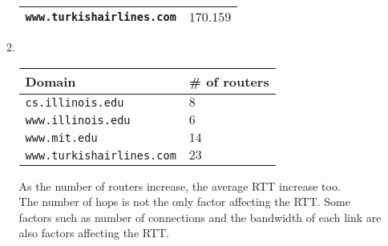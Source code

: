\documentclass[10pt, a4paper]{article}
\begin{document}
\begin{enumerate}
\begin{enumerate}
\begin{tabular}{ll}
        \texttt{www.turkishairlines.com} & $170.159$\\
        \bottomrule
        \end{tabular}
    \item\mbox{}\\
        \begin{tabular}{ll}
        \toprule
        Domain & \# of routers\\
        \midrule
        \texttt{cs.illinois.edu} & $8$\\
        \texttt{www.illinois.edu} & $6$\\
        \texttt{www.mit.edu} & $14$\\
        \texttt{www.turkishairlines.com} & $23$\\
        \bottomrule
        \end{tabular}

        As the number of routers increase, the average RTT increase too.\\
        The number of hops is not the only factor affecting the RTT\@. Some factors such as number of connections and the bandwidth of each link are also factors affecting the RTT\@.
    \end{enumerate}
\end{enumerate}
\end{document}
